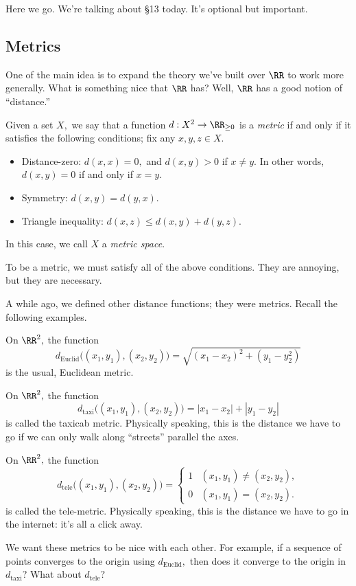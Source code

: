\documentclass[../notes.tex]{subfiles}
\begin{document}

















Here we go. We're talking about \S13 today. It's optional but important.

\subsection{Metrics}
One of the main idea is to expand the theory we've built over $\RR$ to work more generally. What is something nice that $\RR$ has? Well, $\RR$ has a good notion of ``distance.''
\begin{definition}
	Given a set $X,$ we say that a function $d:X^2\to\RR_{\ge0}$ is a \textit{metric} if and only if it satisfies the following conditions; fix any $x,y,z\in X.$
	\begin{itemize}
		\item Distance-zero: $d(x,x)=0,$ and $d(x,y)>0$ if $x\ne y.$ In other words, $d(x,y)=0$ if and only if $x=y.$
		\item Symmetry: $d(x,y)=d(y,x).$
		\item Triangle inequality: $d(x,z)\le d(x,y)+d(y,z).$
	\end{itemize}
	In this case, we call $X$ a \textit{metric space}.
\end{definition}
\begin{warn}
	To be a metric, we must satisfy all of the above conditions. They are annoying, but they are necessary.
\end{warn}
A while ago, we defined other distance functions; they were metrics. Recall the following examples.
\begin{example}
	On $\RR^2,$ the function
	\[d_{\text{Euclid}}\big((x_1,y_1),(x_2,y_2)\big)=\sqrt{(x_1-x_2)^2+(y_1-y_2^2)}\]
	is the usual, Euclidean metric.
\end{example}
\begin{example}
	On $\RR^2,$ the function
	\[d_{\text{taxi}}\big((x_1,y_1),(x_2,y_2)\big)=|x_1-x_2|+|y_1-y_2|\]
	is called the taxicab metric. Physically speaking, this is the distance we have to go if we can only walk along ``streets'' parallel the axes.
\end{example}
\begin{example}
	On $\RR^2,$ the function
	\[d_{\text{tele}}\big((x_1,y_1),(x_2,y_2)\big)=\begin{cases}
		1 & (x_1,y_1)\ne(x_2,y_2), \\
		0 & (x_1,y_1)=(x_2,y_2).
	\end{cases}\]
	is called the tele-metric. Physically speaking, this is the distance we have to go in the internet: it's all a click away.
\end{example}
We want these metrics to be nice with each other. For example, if a sequence of points converges to the origin using $d_{\text{Euclid}},$ then does it converge to the origin in $d_{\text{taxi}}$? What about $d_{\text{tele}}$?
\end{document}
